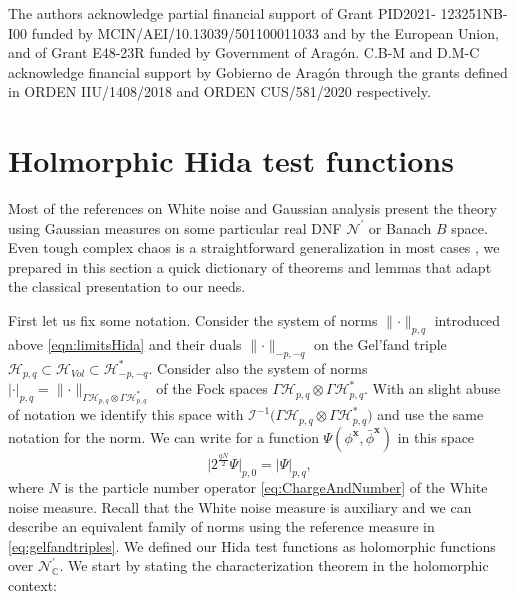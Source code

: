 \documentclass{elsarticle}%
\begin{document}
The authors acknowledge partial financial support of Grant PID2021-
123251NB-I00 funded by MCIN/AEI/10.13039/501100011033 and by the
European Union, and of Grant E48-23R funded by Government of Aragón.
C.B-M and D.M-C acknowledge financial support by Gobierno de Aragón
through the grants defined in ORDEN IIU/1408/2018 and ORDEN
CUS/581/2020 respectively.


\appendix

\section{Holmorphic Hida test functions}
\renewcommand\thetheorem{\Alph{section}.\arabic{theorem}}
\renewcommand\thelemma{\Alph{section}.\arabic{theorem}}
\renewcommand\thecorollary{\Alph{section}.\arabic{corollary}}
\label{app:Hida}
Most of the references on White noise \cite{kondratievGeneralizedFunctionals1996,obataWhiteNoise1994, hidaWhiteNoise1993, kuoWhiteNoise1996,westerkampRecentResults2003} and Gaussian analysis \cite{huAnalysisGaussian2016} present the theory using Gaussian measures on some particular real DNF $\mathcal{N}^\prime$ or Banach $B$ space. Even tough complex chaos is a straightforward generalization in most cases \cite{hidaBrownianMotion1980}, we prepared in this section a quick dictionary of theorems and lemmas that adapt the classical presentation to our needs.

First let us fix some notation. Consider the system of norms $\lVert\cdot \rVert_{p,q}$ introduced above \eqref{eqn:limitsHida} and their duals $\lVert\cdot \rVert_{-p,-q}$ on the Gel'fand triple $
    \mathcal{H}_{p,q} \subset \mathcal{H}_{Vol} \subset \mathcal{H}_{-p,-q}^*$. Consider also the system of norms $\lvert\cdot \rvert_{p,q}=\lVert\cdot \rVert_{\Gamma\mathcal{H}_{p,q}\otimes \Gamma\mathcal{H}_{p,q}^*}$ of the Fock spaces $\Gamma\mathcal{H}_{p,q}\otimes \Gamma\mathcal{H}_{p,q}^*$. With an slight abuse of notation we identify this space with $\mathcal{I}^{-1}\Big(\Gamma\mathcal{H}_{p,q}\otimes \Gamma\mathcal{H}_{p,q}^*\Big)$ and use the same notation for the norm. We can write  for a function $\Psi(\phi^{\mathbf{x}},\bar \phi^{\mathbf{x}})$ in this space
    \begin{equation*}
        \big\lvert 2^{\frac{q N}{2}} \Psi \big\rvert_{p,0}= \big\lvert  \Psi \big\rvert_{p,q},
    \end{equation*}
where $N$ is the particle number operator \eqref{eq:ChargeAndNumber} of the White noise measure. Recall that the White noise measure is auxiliary and we can describe an equivalent family of norms using the reference measure in \eqref{eq:gelfandtriples}.  
We defined our Hida test functions as holomorphic functions over $\mathcal{N}^\prime_{\mathbb{C}}$. We start by stating the characterization theorem in the holomorphic context:
\end{document}
